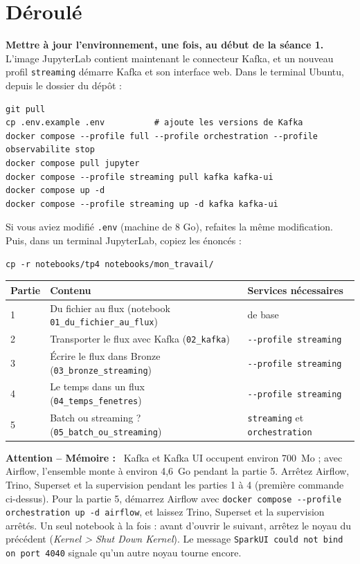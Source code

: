 \documentclass[11pt,a4paper]{article}
\newenvironment{attention}[1][]{\par\medskip\noindent\textbf{\textcolor{lhred}{Attention\if\relax\detokenize{#1}\relax\else{} -- #1\fi{} :}}\ }{\par\medskip}
\newcommand{\cmd}[1]{\texttt{#1}}
\newcommand{\nb}[1]{\textcolor{lhblue}{\texttt{#1}}}
\begin{document}
\section{Déroulé}\label{sec:deroule}

\textbf{Mettre à jour l'environnement, une fois, au début de la séance 1.} L'image JupyterLab
contient maintenant le connecteur Kafka, et un nouveau profil \cmd{streaming} démarre Kafka et son
interface web. Dans le terminal Ubuntu, depuis le dossier du dépôt :
\begin{lstlisting}[style=shell]
git pull
cp .env.example .env          # ajoute les versions de Kafka
docker compose --profile full --profile orchestration --profile observabilite stop
docker compose pull jupyter
docker compose --profile streaming pull kafka kafka-ui
docker compose up -d
docker compose --profile streaming up -d kafka kafka-ui
\end{lstlisting}
Si vous aviez modifié \cmd{.env} (machine de 8 Go), refaites la même modification. Puis, dans un
terminal JupyterLab, copiez les énoncés :
\begin{lstlisting}[style=shell]
cp -r notebooks/tp4 notebooks/mon_travail/
\end{lstlisting}

\begin{center}
\small
\renewcommand{\arraystretch}{1.25}
\begin{tabularx}{\textwidth}{@{}l X l@{}}
\toprule
\textbf{Partie} & \textbf{Contenu} & \textbf{Services nécessaires} \\
\midrule
1 & Du fichier au flux (notebook \nb{01\_du\_fichier\_au\_flux}) & de base \\
2 & Transporter le flux avec Kafka (\nb{02\_kafka}) & \cmd{-{}-profile streaming} \\
3 & Écrire le flux dans Bronze (\nb{03\_bronze\_streaming}) & \cmd{-{}-profile streaming} \\
4 & Le temps dans un flux (\nb{04\_temps\_fenetres}) & \cmd{-{}-profile streaming} \\
5 & Batch ou streaming ? (\nb{05\_batch\_ou\_streaming}) & \cmd{streaming} et \cmd{orchestration} \\
\bottomrule
\end{tabularx}
\end{center}

\begin{attention}[Mémoire]
Kafka et Kafka UI occupent environ 700~Mo ; avec Airflow, l'ensemble monte à environ 4,6~Go
pendant la partie 5. Arrêtez Airflow, Trino, Superset et la supervision
pendant les parties 1 à 4 (première commande ci-dessus). Pour la partie 5, démarrez Airflow avec
\cmd{docker compose -{}-profile orchestration up -d airflow}, et laissez Trino, Superset et la
supervision arrêtés. Un seul notebook à la fois : avant d'ouvrir le
suivant, arrêtez le noyau du précédent (\emph{Kernel > Shut Down Kernel}). Le message
\cmd{SparkUI could not bind on port 4040} signale qu'un autre noyau tourne encore.
\end{attention}
\end{document}

